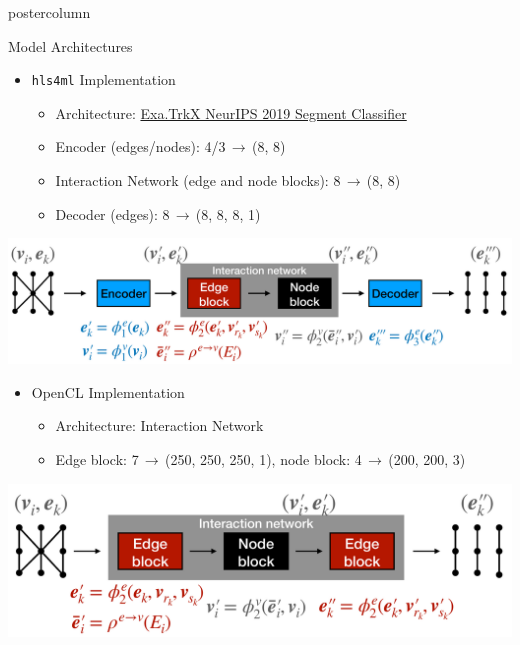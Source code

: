 \documentclass[final,hyperref={pdfpagelabels=false}]{beamer}
\newcommand{\hlsfml}{{\texttt{hls4ml}}\xspace}
\begin{document}
\begin{frame}
\begin{columns}
\begin{column}{.33\textwidth}
\begin{beamercolorbox}[center,wd=\textwidth]{postercolumn}
\begin{minipage}[T]{.95\textwidth}
{            \begin{block}{Model Architectures}
              \begin{itemize}
              \item \hlsfml Implementation
              \begin{itemize}
                  \item Architecture: \href{https://arxiv.org/abs/2003.11603}{Exa.TrkX NeurIPS 2019 Segment Classifier}
                  \item Encoder (edges/nodes): 4/3$\,\to\,$(8, 8)
                  \item Interaction Network (edge and node blocks): 8$\,\to\,$(8, 8)
                  \item Decoder (edges): 8$\,\to\,$(8, 8, 8, 1)
              \end{itemize}
              \end{itemize}
              \begin{center}
                \includegraphics[height=0.2\linewidth]{figures/hls4ml_GNN_resize.pdf}
              \end{center}
              \begin{itemize}
              \item OpenCL Implementation
              \begin{itemize}
                  \item Architecture: Interaction Network
                  \item Edge block: 7$\,\to\,$(250, 250, 250, 1), node block: 4$\,\to\,$(200, 200, 3)
              \end{itemize}
              \end{itemize}
              \begin{center}  \includegraphics[height=0.2\linewidth]{figures/OpenCL_GNN_resize.pdf}
              \end{center}
            \end{block}
                }
              \end{minipage}
            \end{beamercolorbox}
          \end{column}


\end{columns}
\end{frame}
\end{document}
